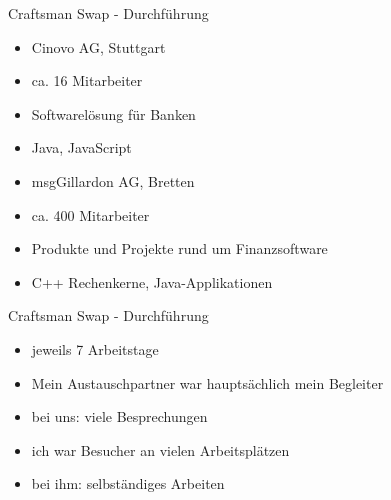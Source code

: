 \begin{frame}{Craftsman Swap - Durchführung}
 
\begin{itemize}
                \item Cinovo AG, Stuttgart
                \item ca. 16 Mitarbeiter
                \item Softwarelösung für Banken
                \item Java, JavaScript
\end{itemize}
              
\begin{itemize}
                \item msgGillardon AG, Bretten
                \item ca. 400 Mitarbeiter
                \item Produkte und Projekte rund um Finanzsoftware
                \item C++ Rechenkerne, Java-Applikationen
\end{itemize}
 
 
\end{frame}
 
 
\begin{frame}{Craftsman Swap - Durchführung}
 
\begin{itemize}
                \item jeweils 7 Arbeitstage
                \item Mein Austauschpartner war hauptsächlich mein \glqq Begleiter\grqq{}
                \item bei uns: viele Besprechungen
                \item ich war \glqq Besucher\grqq{} an vielen Arbeitsplätzen
                \item bei ihm: selbständiges Arbeiten
\end{itemize}
 
 
\end{frame}
 
